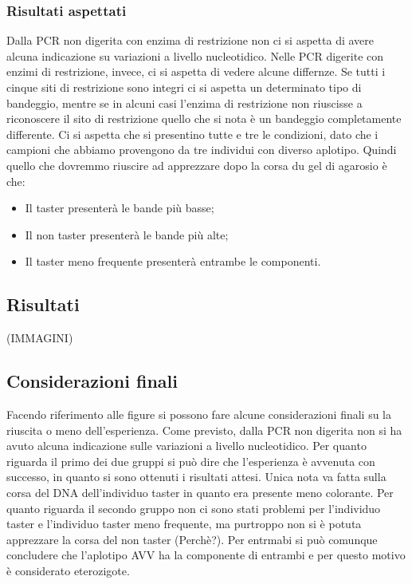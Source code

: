 	    \subsubsection*{Risultati aspettati}
    
        Dalla PCR non digerita con enzima di restrizione non ci si aspetta di avere alcuna indicazione su variazioni a livello nucleotidico. 
        Nelle PCR digerite con enzimi di restrizione, invece, ci si aspetta di vedere alcune differnze. Se tutti i cinque siti di restrizione sono integri ci si aspetta un determinato tipo di bandeggio, mentre se in alcuni casi l'enzima di restrizione non riuscisse a riconoscere il sito di restrizione quello che si nota è un bandeggio completamente differente. 
        Ci si aspetta che si presentino tutte e tre le condizioni, dato che i campioni che abbiamo provengono da tre individui con diverso aplotipo. Quindi quello che dovremmo riuscire ad apprezzare dopo la corsa du gel di agarosio è che:
        \begin{itemize}
            \item Il taster presenterà le bande più basse; 
            \item Il non taster presenterà le bande più alte;
            \item Il taster meno frequente presenterà entrambe le componenti. 
        \end{itemize}
	
	\subsection*{Risultati}
	
		(IMMAGINI)

	\subsection*{Considerazioni finali}
	
	Facendo riferimento alle figure si possono fare alcune considerazioni finali su la riuscita o meno dell'esperienza. 
	Come previsto, dalla PCR non digerita non si ha avuto alcuna indicazione sulle variazioni a livello nucleotidico.
	Per quanto riguarda il primo dei due gruppi si può dire che l'esperienza è avvenuta con successo, in quanto si sono ottenuti i risultati attesi. Unica nota va fatta sulla corsa del DNA dell'individuo taster in quanto era presente meno colorante. 
	Per quanto riguarda il secondo gruppo non ci sono stati problemi per l'individuo taster e l'individuo taster meno frequente, ma purtroppo non si è potuta apprezzare la corsa del non taster (Perchè?). 
	Per entrmabi si può comunque concludere che l'aplotipo AVV ha la componente di entrambi e per questo motivo è considerato eterozigote. 
